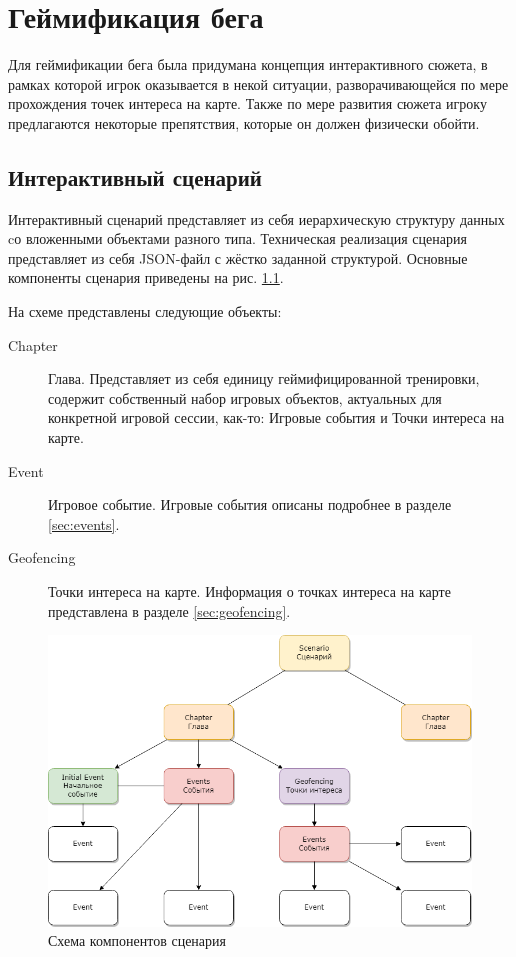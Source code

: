 \chapter{Геймификация бега}
Для геймификации бега была придумана концепция интерактивного сюжета, в рамках которой игрок оказывается в некой ситуации, разворачивающейся по мере прохождения точек интереса на карте. Также по мере развития сюжета игроку предлагаются некоторые препятствия, которые он должен физически обойти.
\section{Интерактивный сценарий}
Интерактивный сценарий представляет из себя иерархическую структуру данных cо вложенными объектами разного типа.
Техническая реализация сценария представляет из себя JSON-файл с жёстко заданной структурой. Основные компоненты сценария приведены на рис. \ref{fig:scenario_components}.

На схеме представлены следующие объекты:
\begin{description}
	\item[Chapter] Глава. Представляет из себя единицу геймифицированной тренировки, содержит собственный набор игровых объектов, актуальных для конкретной игровой сессии, как-то: Игровые события и Точки интереса на карте.
	\item[Event] Игровое событие. Игровые события описаны подробнее в разделе \ref{sec:events}.
	\item[Geofencing] Точки интереса на карте. Информация о точках интереса на карте представлена в разделе \ref{sec:geofencing}.
\end{description}

\begin{figure}[H]
	\centering
	\includegraphics[width=\textwidth]{flesh/runGamification/scenario.png}
	\caption{\label{fig:scenario_components}Схема компонентов сценария}
\end{figure}

